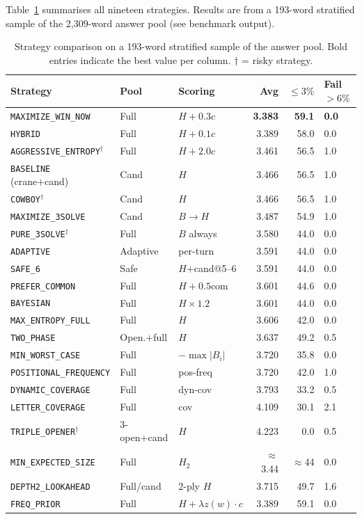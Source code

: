 \documentclass{article}
\begin{document}
Table~\ref{tab:strategies} summarises all nineteen strategies. Results are from a
193-word stratified sample of the 2,309-word answer pool (see benchmark output).

\begin{table}[h!]
  \centering
  \small
  \caption{Strategy comparison on a 193-word stratified sample of the answer pool.
    Bold entries indicate the best value per column. $\dagger$ = risky strategy.}
  \label{tab:strategies}
  \begin{tabular}{lllrrl}
    \toprule
    Strategy & Pool & Scoring & Avg & $\leq3\%$ & Fail$>6\%$ \\
    \midrule
    \texttt{MAXIMIZE\_WIN\_NOW} & Full & $H{+}0.3c$ & \textbf{3.383} & \textbf{59.1} & \textbf{0.0} \\
    \texttt{HYBRID} & Full & $H{+}0.1c$ & 3.389 & 58.0 & 0.0 \\
    \texttt{AGGRESSIVE\_ENTROPY}$^\dagger$ & Full & $H{+}2.0c$ & 3.461 & 56.5 & 1.0 \\
    \texttt{BASELINE} (crane+cand) & Cand & $H$ & 3.466 & 56.5 & 1.0 \\
    \texttt{COWBOY}$^\dagger$ & Cand & $H$ & 3.466 & 56.5 & 1.0 \\
    \texttt{MAXIMIZE\_3SOLVE} & Cand & $B{\to}H$ & 3.487 & 54.9 & 1.0 \\
    \texttt{PURE\_3SOLVE}$^\dagger$ & Full & $B$ always & 3.580 & 44.0 & 0.0 \\
    \texttt{ADAPTIVE} & Adaptive & per-turn & 3.591 & 44.0 & 0.0 \\
    \texttt{SAFE\_6} & Safe & $H$+cand@5--6 & 3.591 & 44.0 & 0.0 \\
    \texttt{PREFER\_COMMON} & Full & $H{+}0.5\text{com}$ & 3.601 & 44.6 & 0.0 \\
    \texttt{BAYESIAN} & Full & $H{\times}1.2$ & 3.601 & 44.0 & 0.0 \\
    \texttt{MAX\_ENTROPY\_FULL} & Full & $H$ & 3.606 & 42.0 & 0.0 \\
    \texttt{TWO\_PHASE} & Open.+full & $H$ & 3.637 & 49.2 & 0.5 \\
    \texttt{MIN\_WORST\_CASE} & Full & $-\max|B_i|$ & 3.720 & 35.8 & 0.0 \\
    \texttt{POSITIONAL\_FREQUENCY} & Full & pos-freq & 3.720 & 42.0 & 1.0 \\
    \texttt{DYNAMIC\_COVERAGE} & Full & dyn-cov & 3.793 & 33.2 & 0.5 \\
    \texttt{LETTER\_COVERAGE} & Full & cov & 4.109 & 30.1 & 2.1 \\
    \texttt{TRIPLE\_OPENER}$^\dagger$ & 3-open+cand & $H$ & 4.223 & 0.0 & 0.5 \\
    \texttt{MIN\_EXPECTED\_SIZE} & Full & $H_2$ & $\approx$3.44 & $\approx$44 & 0.0 \\
    \texttt{DEPTH2\_LOOKAHEAD} & Full/cand & 2-ply $H$ & 3.715 & 49.7 & 1.6 \\
    \texttt{FREQ\_PRIOR} & Full & $H{+}\lambda z(w){\cdot}c$ & 3.389 & 59.1 & 0.0 \\
    \bottomrule
  \end{tabular}
\end{table}
\end{document}
